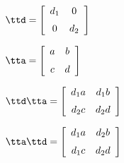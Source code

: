 {$\ttd = \left[ \begin {array}{cc} d_1&0\\\noalign{\medskip}0&d_2\end {array}
 \right]$
 
$\tta = \left[ \begin {array}{cc} a&b\\\noalign{\medskip}c&d\end {array}
 \right] $}
{$\ttd\tta= \left[ \begin {array}{cc} d_1a&d_1b\\\noalign{\medskip}d_2c&d_2d\end {array}
 \right] $

$\tta\ttd =  \left[ \begin {array}{cc} d_1a&d_2b\\\noalign{\medskip}d_1c&d_2d\end {array}\right]$
}
  
